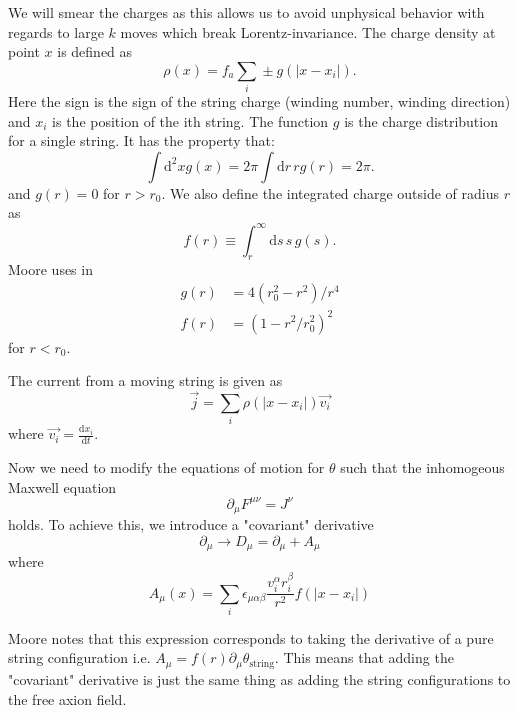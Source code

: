\documentclass[a4paper]{article}
\begin{document}
We will smear the charges as this allows us to avoid unphysical behavior with regards to large $k$ moves which break Lorentz-invariance.
The charge density at point $x$ is defined as
\begin{equation}
	\rho(x) = f_a \sum_i \pm g(|x - x_i|).
\end{equation}
Here the sign is the sign of the string charge (winding number, winding direction) and $x_i$ is the position of the ith string.
The function $g$ is the charge distribution for a single string.
It has the property that:
\begin{equation}
	\int \mathrm{d}^2 x g(x) = 2 \pi \int \mathrm{d} r \, r g(r) = 2\pi.
\end{equation}
and $g(r) = 0$ for $r > r_0$.
We also define the integrated charge outside of radius $r$ as
\begin{equation}
	f(r) \equiv \int_r^\infty \mathrm{d} s \, s \, g(s).
\end{equation}
Moore uses in \cite{Axion2D_Fleury:2016xrz}
\begin{align}
	g(r) &= 4 (r_0^2 - r^2) / r^4 \\
	f(r) &= (1 - r^2 / r_0^2)^2
\end{align}
for $r < r_0$.

The current from a moving string is given as 
\begin{equation}
	\vec{j} = \sum_i \rho(|x - x_i|) \vec{v_i}
\end{equation}
where $\vec{v_i} = \frac{\mathrm{d} x_i}{\mathrm{d} t}$.

Now we need to modify the equations of motion for $\theta$ such that the inhomogeous Maxwell equation 
\begin{equation}
	\partial_\mu F^{\mu \nu} = J^\nu
\end{equation}
holds.
To achieve this, we introduce a "covariant" derivative
\begin{equation}
	\partial_\mu \to D_\mu = \partial_\mu + A_\mu
\end{equation}
where 
\begin{equation}
	A_\mu(x) = \sum_i \epsilon_{\mu \alpha \beta} \frac{v_i^\alpha r_i^\beta}{r^2} f(|x - x_i|)
\end{equation}

Moore notes that this expression corresponds to taking the derivative of a pure string configuration i.e.
$A_\mu = f(r) \partial_\mu \theta_{\mathrm{string}}$.
This means that adding the "covariant" derivative is just the same thing as adding the string configurations to the free axion field.






\newpage
\printbibliography
\end{document}
